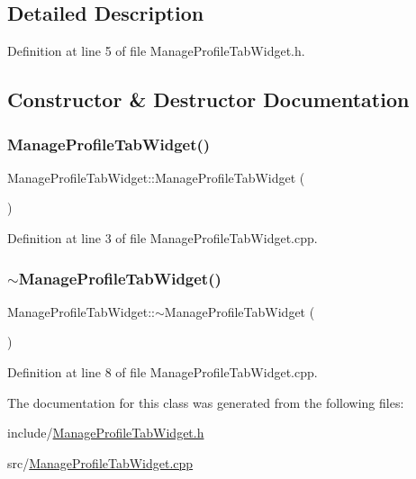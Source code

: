 \subsection{Detailed Description}


Definition at line 5 of file Manage\+Profile\+Tab\+Widget.\+h.



\subsection{Constructor \& Destructor Documentation}
\mbox{\label{class_manage_profile_tab_widget_abb60fe68d13e29251a53cfaf18db5811}} 
\subsubsection{\texorpdfstring{Manage\+Profile\+Tab\+Widget()}{ManageProfileTabWidget()}}
{\footnotesize\ttfamily Manage\+Profile\+Tab\+Widget\+::\+Manage\+Profile\+Tab\+Widget (\begin{DoxyParamCaption}{ }\end{DoxyParamCaption})}



Definition at line 3 of file Manage\+Profile\+Tab\+Widget.\+cpp.

\mbox{\label{class_manage_profile_tab_widget_a1f16db73410c81e684fccac244bb0788}} 
\subsubsection{\texorpdfstring{$\sim$\+Manage\+Profile\+Tab\+Widget()}{~ManageProfileTabWidget()}}
{\footnotesize\ttfamily Manage\+Profile\+Tab\+Widget\+::$\sim$\+Manage\+Profile\+Tab\+Widget (\begin{DoxyParamCaption}{ }\end{DoxyParamCaption})}



Definition at line 8 of file Manage\+Profile\+Tab\+Widget.\+cpp.



The documentation for this class was generated from the following files\+:\begin{DoxyCompactItemize}
\item 
include/\hyperlink{_manage_profile_tab_widget_8h}{Manage\+Profile\+Tab\+Widget.\+h}\item 
src/\hyperlink{_manage_profile_tab_widget_8cpp}{Manage\+Profile\+Tab\+Widget.\+cpp}\end{DoxyCompactItemize}
